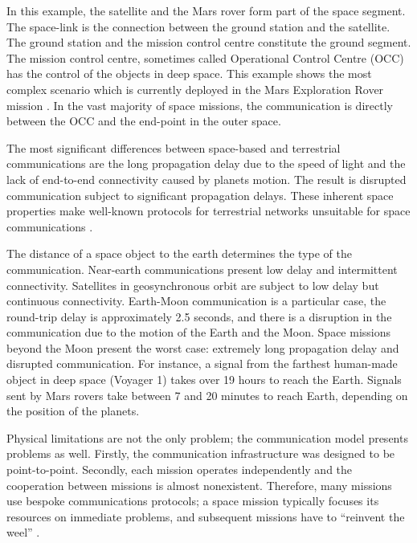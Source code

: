 In this example, the satellite and the Mars rover form part of the space segment. The space-link is the connection between the ground station and the satellite.  The ground station and the mission control centre constitute the ground segment. The mission control centre, sometimes called Operational Control Centre (OCC) has the control of the objects in deep space. This example shows the most complex scenario which is currently deployed in the Mars Exploration Rover mission \cite{crisp2003mars}. In the vast majority of space missions, the communication is directly between the OCC and the end-point in the outer space.

 The most significant differences between space-based and terrestrial communications are the long propagation delay due to the speed of light and the lack of end-to-end connectivity caused by planets motion. The result is disrupted communication subject to significant propagation delays. These inherent space properties make well-known protocols for terrestrial networks unsuitable for space communications \cite{fall2003delay}.


The distance of a space object to the earth determines the type of the communication. Near-earth communications present low delay and intermittent connectivity. Satellites in geosynchronous orbit are subject to low delay but continuous connectivity. Earth-Moon communication is a particular case, the round-trip delay is approximately 2.5 seconds, and there is a disruption in the communication due to the motion of the Earth and the Moon. Space missions beyond the Moon present the worst case: extremely long propagation delay and disrupted communication. For instance,  a signal from the farthest human-made object in deep space (Voyager 1) takes over 19 hours to reach the Earth. Signals sent by Mars rovers take between 7 and 20 minutes to reach Earth, depending on the position of the planets. 



Physical limitations are not the only problem; the communication model presents problems as well. Firstly,  the communication infrastructure was designed to be point-to-point. Secondly, each mission operates independently and the cooperation between missions is almost nonexistent.  Therefore, many missions use bespoke communications protocols; a space mission typically focuses its resources on immediate problems, and subsequent missions have to ``reinvent the weel'' \cite{burleigh2003interplanetary}. 


